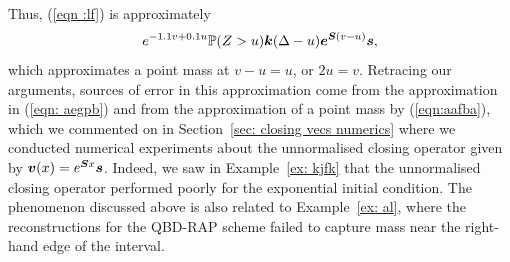 Thus, (\ref{eqn :lf}) is approximately  
\[e^{-1.1v+0.1u} \mathbb P(Z>u) \boldsymbol k(\Delta-u)\boldsymbol e^{\boldsymbol S(v-u)}\boldsymbol s,\]
which approximates a point mass at \(v-u=u\), or \(2u=v\). Retracing our arguments, sources of error in this approximation come from the approximation in (\ref{eqn: aegpb}) and from the approximation of a point mass by (\ref{eqn:aafba}), which we commented on in Section~\ref{sec: closing vecs numerics} where we conducted numerical experiments about the unnormalised closing operator given by \(\boldsymbol v(x) = e^{\boldsymbol S x}\boldsymbol s\). Indeed, we saw in Example~\ref{ex: kjfk} that the unnormalised closing operator performed poorly for the exponential initial condition. The phenomenon discussed above is also related to Example~\ref{ex: al}, where the reconstructions for the QBD-RAP scheme failed to capture mass near the right-hand edge of the interval. 

